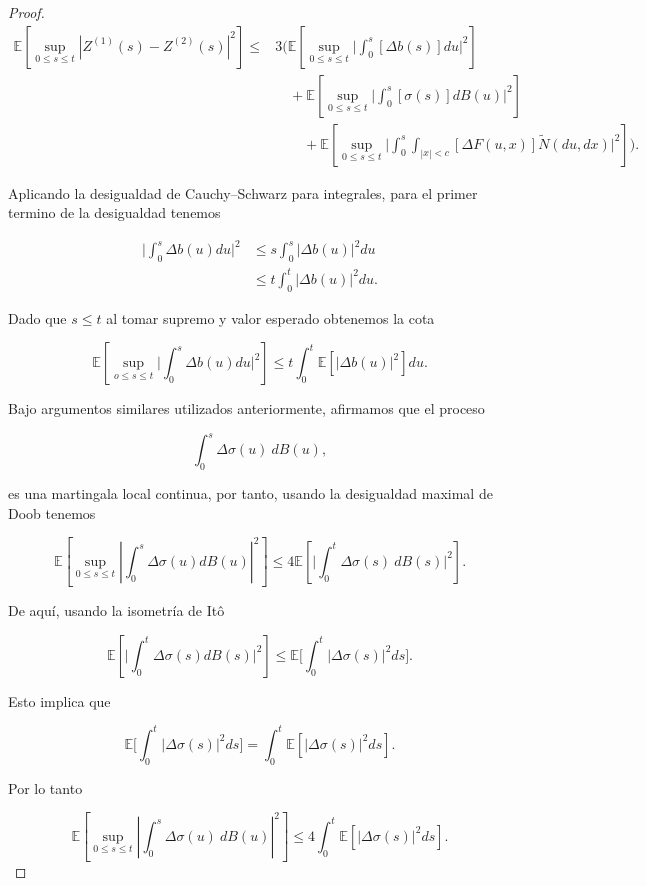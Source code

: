 \documentclass[
  spanish,
  us-letterpaper,
]{scrreprt}
\theoremstyle{plain}
\theoremstyle{plain}
\theoremstyle{definition}
\theoremstyle{plain}
\theoremstyle{remark}
\begin{document}
\begin{proof}
\[
    \begin{aligned}
        \mathbb{E}\left[\sup\limits_{0\leq s\leq t}|Z^{(1)}(s) - Z^{(2)}(s)|^2\right] \leq & 3\Bigg(\mathbb{E}\left[\sup\limits_{0\leq s\leq t}\Bigg|\int_0^s [\Delta b(s)]du\Bigg|^2\right]\\ 
        &\quad + \mathbb{E}\left[\sup\limits_{0\leq s\leq t}\Bigg|\int_0^s [\sigma(s)]dB(u)\Bigg|^2\right]\\ 
        & \qquad + \mathbb{E}\left[\sup\limits_{0\leq s\leq t}\Bigg|\int_0^s\int_{|x|<c} [\Delta F(u,x)]\widetilde{N}(du,dx)\Bigg|^2\right]\Bigg).
    \end{aligned}
\]

Aplicando la desigualdad de Cauchy--Schwarz para integrales, para el
primer termino de la desigualdad tenemos

\[
    \begin{aligned}
        \Bigg|\int_0^s \Delta b(u)du\Bigg|^2 & \leq s\int_0^s |\Delta b(u)|^2du\\ 
        & \leq t\int_0^t |\Delta b(u)|^2du.
    \end{aligned}
\]

Dado que \(s\leq t\) al tomar supremo y valor esperado obtenemos la cota

\[
\mathbb{E}\left[\sup\limits_{o\leq s\leq t}\Bigg|\int_0^s \Delta b(u)du\Bigg|^2\right]\leq t\int_0^t \mathbb{E}[|\Delta b(u)|^2]du.
\]

Bajo argumentos similares utilizados anteriormente, afirmamos que el
proceso

\[
    \int_0^s \Delta \sigma (u)\ dB(u), 
\]

es una martingala local continua, por tanto, usando la desigualdad
maximal de Doob tenemos

\[
    \mathbb{E}\left[\sup\limits_{0\leq s\leq t}\left|\int_0^s \Delta \sigma (u)dB(u)\right|^2\right]\leq 4\mathbb{E}\left[\Bigg|\int_0^t \Delta \sigma (s)\ dB(s)\Bigg|^2\right].
\]

De aquí, usando la isometría de Itô

\[
\mathbb{E}\left[\Bigg|\int_0^t \Delta \sigma (s) dB(s)\Bigg|^2\right] \leq \mathbb{E}\Bigg[\int_0^t |\Delta \sigma (s)|^2ds\Bigg].
\]

Esto implica que

\[
    \mathbb{E}\Bigg[\int_0^t |\Delta \sigma (s)|^2ds\Bigg] = \int_0^t \mathbb{E}[|\Delta \sigma (s)|^2ds].
\]

Por lo tanto

\[
    \mathbb{E}\left[\sup\limits_{0\leq s\leq t}\left|\int_0^s \Delta \sigma (u)\ dB(u)\right|^2\right]\leq 4\int_0^t \mathbb{E}[|\Delta \sigma (s)|^2ds].
\]


\end{proof}
\end{document}
